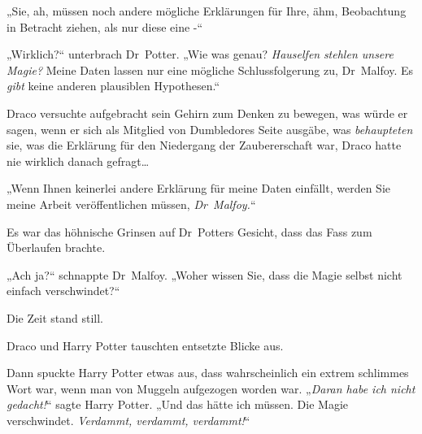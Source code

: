 „Sie, ah, müssen noch andere mögliche Erklärungen für Ihre, ähm, Beobachtung in Betracht ziehen, als nur diese eine -“

„Wirklich?“ unterbrach Dr~Potter. „Wie was genau? \emph{Hauselfen} \emph{stehlen unsere Magie?} Meine Daten lassen nur eine mögliche Schlussfolgerung zu, Dr~Malfoy. Es \emph{gibt} keine anderen plausiblen Hypothesen.“

Draco versuchte aufgebracht sein Gehirn zum Denken zu bewegen, was würde er sagen, wenn er sich als Mitglied von Dumbledores Seite ausgäbe, was \emph{behaupteten} sie, was die Erklärung für den Niedergang der Zaubererschaft war, Draco hatte nie wirklich danach gefragt…

„Wenn Ihnen keinerlei andere Erklärung für meine Daten einfällt, werden Sie meine Arbeit veröffentlichen müssen, \emph{Dr~Malfoy.}“

Es war das höhnische Grinsen auf Dr~Potters Gesicht, dass das Fass zum Überlaufen brachte.

„Ach ja?“ schnappte Dr~Malfoy. „Woher wissen Sie, dass die Magie selbst nicht einfach verschwindet?“

Die Zeit stand still.

Draco und Harry Potter tauschten entsetzte Blicke aus.

Dann spuckte Harry Potter etwas aus, dass wahrscheinlich ein extrem schlimmes Wort war, wenn man von Muggeln aufgezogen worden war. „\emph{Daran habe ich nicht gedacht!}“ sagte Harry Potter. „Und das hätte ich müssen. Die Magie verschwindet. \emph{Verdammt, verdammt, verdammt!}“

